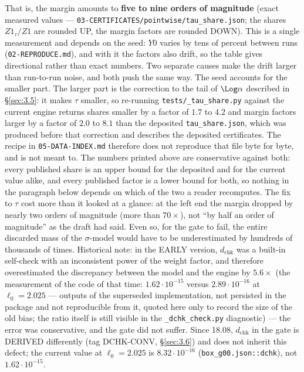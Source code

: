 That is, the margin amounts to \textbf{five to nine orders of magnitude} (exact measured values --- \texttt{03-\allowbreak CERTIFICATES/\allowbreak pointwise/\allowbreak tau\_\allowbreak share.json}; the shares $Z1_\tau / Z1$ are rounded UP, the margin factors are rounded DOWN). This is a single measurement and depends on the seed: $Y0$ varies by tens of percent between runs (\texttt{02-\allowbreak REPRODUCE.md}), and with it the factors also drift, so the table gives directional rather than exact numbers. Two separate causes make the drift larger than run-to-run noise, and both push the same way. The seed accounts for the smaller part. The larger part is the correction to the tail of $\Log\alpha$ described in \S\ref{sec:3.5}: it makes $\tau$ smaller, so re-running \texttt{tests/\allowbreak \_\allowbreak tau\_\allowbreak share.py} against the current engine returns shares smaller by a factor of $1.7$ to $4.2$ and margin factors larger by a factor of $2.0$ to $8.1$ than the deposited \texttt{tau\_\allowbreak share.json}, which was produced before that correction and describes the deposited certificates. The recipe in \texttt{05-\allowbreak DATA-\allowbreak INDEX.md} therefore does not reproduce that file byte for byte, and is not meant to. The numbers printed above are conservative against both: every published share is an upper bound for the deposited and for the current value alike, and every published factor is a lower bound for both, so nothing in the paragraph below depends on which of the two a reader recomputes. The fix to $\tau$ cost more than it looked at a glance: at the left end the margin dropped by nearly two orders of magnitude (more than $70\times$), not ``by half an order of magnitude'' as the draft had said. Even so, for the gate to fail, the entire discarded mass of the $\sigma$-model would have to be underestimated by hundreds of thousands of times. Historical note: in the EARLY version, $d_{\mathrm{chk}}$ was a built-in self-check with an inconsistent power of the weight factor, and therefore overestimated the discrepancy between the model and the engine by $5.6\times$ (the measurement of the code of that time: $1.62\cdot 10^{-15}$ versus $2.89\cdot 10^{-16}$ at $\ell_{0}=2.025$ --- outputs of the superseded implementation, not persisted in the package and not reproducible from it, quoted here only to record the size of the old bias; the ratio itself is still visible in the \texttt{\_\allowbreak dchk\_\allowbreak check.py} diagnostic) --- the error was conservative, and the gate did not suffer. Since 18.08, $d_{\mathrm{chk}}$ in the gate is DERIVED differently (tag DCHK-CONV, \S\ref{sec:3.6}) and does not inherit this defect; the current value at $\ell_{0}=2.025$ is $8.32\cdot 10^{-16}$ (\texttt{box\_\allowbreak g00.json::\allowbreak dchk}), not $1.62\cdot 10^{-15}$.


